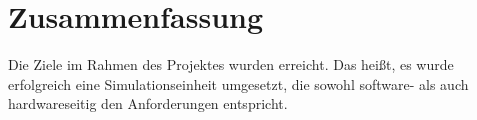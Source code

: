 \chapter{Zusammenfassung}
Die Ziele im Rahmen des Projektes wurden erreicht. Das heißt, es wurde erfolgreich eine Simulationseinheit umgesetzt, die sowohl software- als auch hardwareseitig den Anforderungen entspricht. %